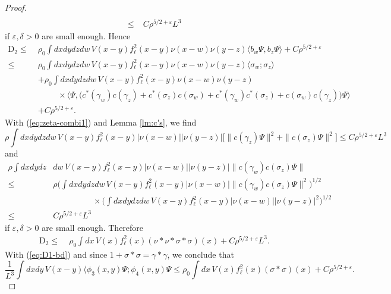 \documentclass[a4paper,11pt]{article}
\def\eps{\varepsilon}
\numberwithin{equation}{section}
\begin{document}
\begin{proof}
\[\begin{split}
 \\ \leq \; &C \rho^{5/2+\eps} L^3 
  \end{split} \]
if $\eps , \delta > 0$ are small enough. Hence
\[ \begin{split}  \text{D}_2 \leq \; &\rho_0 \int dx dy dz dw \, V(x-y) f_\ell^2 (x-y) \nu (x-w) \nu (y-z) \langle b_w \Psi, b_z \Psi \rangle + C \rho^{5/2+\eps} \\ 
\leq \; &\rho_0 \int dx dy dz dw \, V(x-y) f_\ell^2 (x-y) \nu (x-w) \nu (y-z) \langle \sigma_w ; \sigma_z \rangle \\ &+ 
\rho_0 \int dx dy dz dw \, V(x-y) f_\ell^2 (x-y) \nu (x-w) \nu (y-z) \\ &\hspace{1cm} \times \langle \Psi, \big( c^* (\gamma_w) c (\gamma_z) + c^* (\sigma_z) c (\sigma_w) + c^* (\gamma_w) c^* (\sigma_z) + c (\sigma_w) c (\gamma_z) \big) \Psi \rangle \\ &+C \rho^{5/2+\eps} .
\end{split} \] 
With (\ref{eq:zeta-combi1}) and Lemma \ref{lm:c's}, we find 
\[ \rho \int dx dy dz dw \, V(x-y)f_\ell^2(x-y) |\nu (x-w)| |\nu (y-z)| \big[ \| c (\gamma_z) \Psi \|^2 + \| c (\sigma_z) \Psi \|^2 \big] \leq C \rho^{5/2+\eps} L^3 \]
and 
\[ \begin{split} \rho \int dx dy dz &dw \, V(x-y) f_\ell^2(x-y) |\nu (x-w)| |\nu (y-z)|  \| c (\gamma_w) c (\sigma_z) \Psi \| \\ \leq \; &\rho \Big( \int dx dy dz dw \, V(x-y)f_\ell^2(x-y) |\nu (x-w)| \|c (\gamma_w) c (\sigma_z) \Psi \|^2 \Big)^{1/2} \\ &\hspace{2cm} \times  \Big(  \int dx dy dz dw \, V(x-y) f_\ell^2(x-y)|\nu (x-w)|  |\nu (y-z)|^2 \Big)^{1/2} \\ \leq \; &C \rho^{5/2+\eps} L^3 \end{split} \]
if $\eps, \delta > 0$ are small enough. Therefore
\[ \begin{split}  \text{D}_2 \leq \; &\rho_0 \int dx\, V(x) f_\ell^2 (x)  (\nu * \nu * \sigma * \sigma) (x) + C \rho^{5/2+\eps} L^3. \end{split} \] 
With (\ref{eq:D1-bd}) and since $1 + \sigma*\sigma = \gamma * \gamma$, we conclude that 
\[\frac{1}{L^3}  \int dx dy \, V(x-y) \langle \phi_3 (x,y) \Psi ; \phi_4 (x,y) \Psi \leq \rho_0  \int dx \, V(x) f_\ell^2 (x) (\sigma * \sigma) (x) + C \rho^{5/2+\eps}.\] 
\end{proof} 
\end{document}
